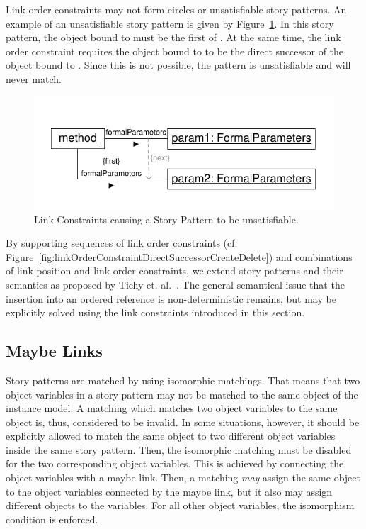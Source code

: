 {Link order constraints may not form circles or unsatisfiable story patterns. An example of an unsatisfiable story pattern is given by Figure~\ref{fig:linkConstraintUnsatisfiablePattern}. In this story pattern, the object bound to  must be the first  of . At the same time, the link order constraint requires the object bound to  to be the direct successor of the object bound to . Since this is not possible, the pattern is unsatisfiable and will never match.


\begin{figure}[htbp]
\center
\includegraphics[width=0.75\columnwidth]{figures/LinkConstraintUnsatisfiablePattern}
\caption{Link Constraints causing a Story Pattern to be unsatisfiable.}
\label{fig:linkConstraintUnsatisfiablePattern}
\end{figure}

By supporting sequences of link order constraints (cf. Figure~\ref{fig:linkOrderConstraintDirectSuccessorCreateDelete}) and combinations of link position and link order constraints, we extend story patterns and their semantics as proposed by Tichy et. al.~\cite{TMG06}. The general semantical issue that the insertion into an ordered reference is non-deterministic remains, but may be explicitly solved using the link constraints introduced in this section. 

} %

\subsection{Maybe Links}
\label{sec:StoryPatterns:specialLinks:maybeLink}

Story patterns are matched by using isomorphic matchings. 
That means that two object variables in a story pattern may not be matched to the same object of the instance model. 
A matching which matches two object variables to the same object is, thus, considered to be invalid. 
In some situations, however, it should be explicitly allowed to match the same object to two different object variables inside the same story pattern. 
Then, the isomorphic matching must be disabled for the two corresponding object variables. 
This is achieved by connecting the object variables with a maybe link. 
Then, a matching \emph{may} assign the same object to the object variables connected by the maybe link, but it also may assign different objects to the variables.
For all other object variables, the isomorphism condition is enforced.


